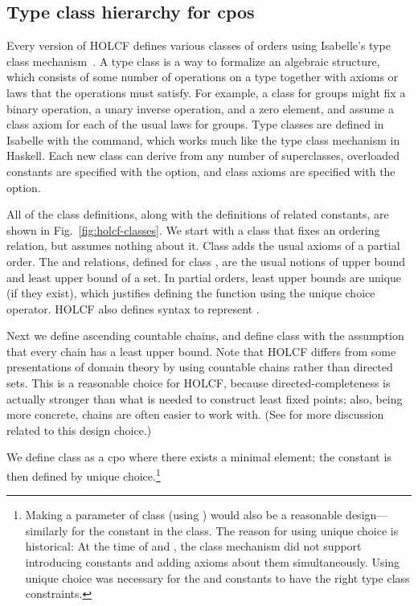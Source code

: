 \subsection{Type class hierarchy for cpos}
\label{sec:holcf-classes}

Every version of HOLCF defines various classes of orders using Isabelle's type class mechanism~\cite{isabelle-classes}. A type class is a way to formalize an algebraic structure, which consists of some number of operations on a type together with axioms or laws that the operations must satisfy. For example, a class for groups might fix a binary operation, a unary inverse operation, and a zero element, and assume a class axiom for each of the usual laws for groups. Type classes are defined in Isabelle with the  command, which works much like the type class mechanism in Haskell. Each new class can derive from any number of superclasses, overloaded constants are specified with the  option, and class axioms are specified with the  option.

All of the  class definitions, along with the definitions of related constants, are shown in Fig.~\ref{fig:holcf-classes}. We start with a class  that fixes an ordering relation, but assumes nothing about it. Class  adds the usual axioms of a partial order. The  and  relations, defined for class , are the usual notions of upper bound and least upper bound of a set. In partial orders, least upper bounds are unique (if they exist), which justifies defining the  function using the unique choice operator. HOLCF also defines syntax  to represent .

Next we define ascending countable chains, and define class  with the assumption that every chain has a least upper bound. Note that HOLCF differs from some presentations of domain theory by using countable chains rather than directed sets. This is a reasonable choice for HOLCF, because directed-completeness is actually stronger than what is needed to construct least fixed points; also, being more concrete, chains are often easier to work with. (See \cite[\S2.2.4]{abramsky94domain} for more discussion related to this design choice.)

We define class  as a cpo where there exists a minimal element; the constant  is then defined by unique choice.\footnote{Making  a parameter of class  (using ) would also be a reasonable design---similarly for the  constant in the  class. The reason for using unique choice is historical: At the time of  and , the class mechanism did not support introducing constants and adding axioms about them simultaneously. Using unique choice was necessary for the  and  constants to have the right type class constraints.}


